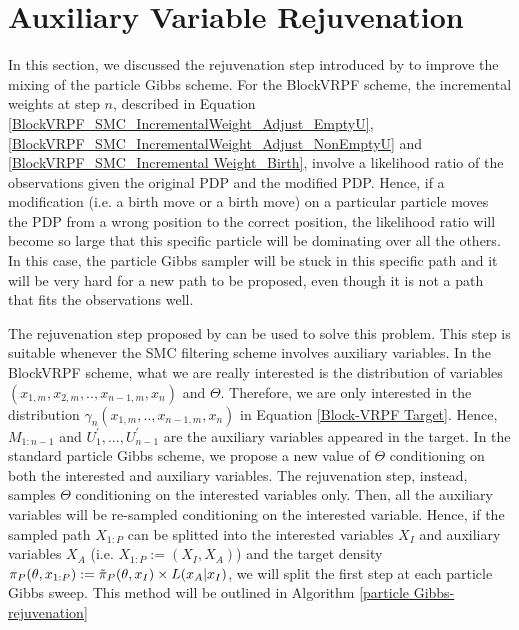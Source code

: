 \documentclass[12pt,a4paper]{article}
\begin{document}
\section{Auxiliary Variable Rejuvenation}
In this section, we discussed the rejuvenation step introduced by \cite{finke2014static} to improve the mixing of the particle Gibbs scheme. For the BlockVRPF scheme, the incremental weights at step $n$, described in Equation \eqref{BlockVRPF_SMC_IncrementalWeight_Adjust_EmptyU},\eqref{BlockVRPF_SMC_IncrementalWeight_Adjust_NonEmptyU} and \eqref{BlockVRPF_SMC_Incremental Weight_Birth}, involve a likelihood ratio of the observations given the original PDP and the modified PDP. Hence, if a modification (i.e. a birth move or a birth move) on a particular particle moves the PDP from a wrong position to the correct position, the likelihood ratio will become so large that this specific particle will be dominating over all the others. In this case, the particle Gibbs sampler will be stuck in this specific path and it will be very hard for a new path to be proposed, even though it is not a path that fits the observations well. 

The rejuvenation step proposed by \cite{finke2014static} can be used to solve this problem. This step is suitable whenever the SMC filtering scheme involves auxiliary variables. In the BlockVRPF scheme, what we are really interested is the distribution of variables $(x_{1,m},x_{2,m},..,x_{n-1,m},x_n)$ and $\Theta$. Therefore, we are only interested in the distribution $\gamma_{n}(x_{1,m},..,\allowbreak x_{n-1,m},x_n)$ in Equation \eqref{Block-VRPF Target}. Hence, $M_{1:n-1}$ and $U_1^{'},...,U_{n-1}^{'}$ are the auxiliary variables appeared in the target. In the standard particle Gibbs scheme, we propose a new value of $\Theta$ conditioning on both the interested and auxiliary variables. The rejuvenation step, instead, samples $\Theta$ conditioning on the interested variables only. Then, all the auxiliary variables will be re-sampled conditioning on the interested variable. Hence, if the sampled path $X_{1:P}$ can be splitted into the interested variables $X_I$ and auxiliary variables $X_A$ (i.e. $X_{1:P} := (X_I,X_A)$) and the target density $\pi_{P}(\theta,x_{1:P}) := \Tilde{\pi}_P(\theta,x_I)\times L(x_A|x_I)$, we will split the first step at each particle Gibbs sweep. This method will be outlined in Algorithm \ref{particle Gibbs-rejuvenation}
\end{document}
